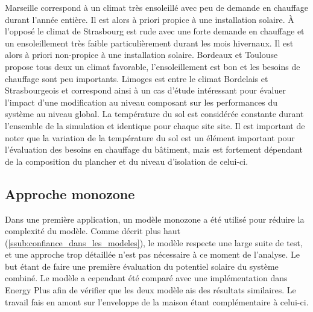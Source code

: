 Marseille correspond à un climat très ensoleillé avec peu de demande en chauffage
durant l’année entière. Il est alors à priori propice à une installation solaire.
À l’opposé le climat de Strasbourg est rude avec une forte demande en chauffage et
un ensoleillement très faible particulièrement durant les mois hivernaux. Il est alors
à priori non-propice à une installation solaire. Bordeaux et Toulouse propose tous deux
un climat favorable, l’ensoleillement est bon et les besoins de chauffage sont peu
importants. Limoges est entre le climat Bordelais et Strasbourgeois et correspond
ainsi à un cas d’étude intéressant pour évaluer l’impact d’une modification au niveau
composant sur les performances du système au niveau global.
La température du sol est considérée constante durant l’ensemble de la simulation
et identique pour chaque site site. Il est important de noter que la variation de
la température du sol est un élément important pour l’évaluation des besoins en chauffage
du bâtiment, mais est fortement dépendant de la composition du plancher et du niveau
d’isolation de celui-ci.



\subsection{Approche monozone} %
\label{sub:approche_monozone}
Dans une première application, un modèle monozone a été utilisé pour réduire la
complexité du modèle. Comme décrit plus haut (\autoref{ssub:confiance_dans_les_modeles}),
le modèle respecte une large suite de test, et une approche trop détaillée n’est pas
nécessaire à ce moment de l’analyse. Le but étant de faire une première évaluation du
potentiel solaire du système combiné.
Le modèle a cependant été comparé avec une implémentation dans Energy Plus afin de
vérifier que les deux modèle ais des résultats similaires. Le travail fais en amont
sur l’enveloppe de la maison étant complémentaire à celui-ci.


